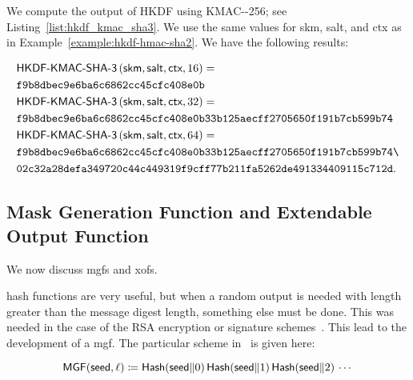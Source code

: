 \begin{example}
\label{example:hkdf-kmac-sha3}

We compute the output of HKDF using KMAC-\ShaThree{}-256;
see Listing~\ref{list:hkdf_kmac_sha3}.
We use the same values for \textsf{skm}, \textsf{salt}, and \textsf{ctx}
as in Example~\ref{example:hkdf-hmac-sha2}.
We have the following results:

\begin{align}
    &\textsf{HKDF-KMAC-\ShaThree{}}\parens{
        \textsf{skm},\textsf{salt},\textsf{ctx}, 16} = \nonumber\\
    &\texttt{f9b8dbec9e6ba6c6862cc45cfc408e0b}
        \nonumber\\
    &\textsf{HKDF-KMAC-\ShaThree{}}\parens{
        \textsf{skm},\textsf{salt},\textsf{ctx}, 32} = \nonumber\\
    &\texttt{f9b8dbec9e6ba6c6862cc45cfc408e0b33b125aecff2705650f191b7cb599b74}
        \nonumber\\
    &\textsf{HKDF-KMAC-\ShaThree{}}\parens{
        \textsf{skm},\textsf{salt},\textsf{ctx}, 64} = \nonumber\\
    &\texttt{f9b8dbec9e6ba6c6862cc45cfc408e0b33b125aecff2705650f191b7cb599b74\textbackslash}
        \nonumber\\
    &\texttt{02c32a28defa349720c44c449319f9cff77b211fa5262de491334409115c712d}.
\end{align}


\end{example}


\subsection{Mask Generation Function and Extendable Output Function}
\label{app:crypto_mgf_xof}

We now discuss \glspl{mgf} and \glspl{xof}.

\Glspl{hash function} are very useful,
but when a random output is needed with length greater than
the message digest length, something else must be done.
This was needed in the case of the RSA
encryption or signature schemes~\cite{cryptoeprint:2006/223,rfc8017}.
This lead to the development of a \gls{mgf}.
The particular scheme in~\cite{rfc8017} is given here:

\begin{equation}
    \textsf{MGF}(\textsf{seed}, \ell) \coloneqq{}
        \textsf{Hash}(\textsf{seed}\|0)\,
        \textsf{Hash}(\textsf{seed}\|1)\,
        \textsf{Hash}(\textsf{seed}\|2)\,\cdots
\end{equation}

